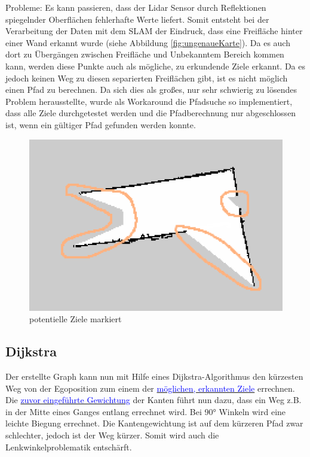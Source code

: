 Probleme:
Es kann passieren, dass der Lidar Sensor durch Reflektionen spiegelnder Oberflächen fehlerhafte Werte liefert. Somit entsteht bei der Verarbeitung der Daten mit dem SLAM der Eindruck, dass eine Freifläche hinter einer Wand erkannt wurde (siehe Abbildung \ref{fig:ungenaueKarte}). Da es auch dort zu Übergängen zwischen Freifläche und Unbekanntem Bereich kommen kann, werden diese Punkte auch als mögliche, zu erkundende Ziele erkannt. Da es jedoch keinen Weg zu diesen separierten Freiflächen gibt, ist es nicht möglich einen Pfad zu berechnen. Da sich dies als großes, nur sehr schwierig zu lösendes Problem herausstellte, wurde als Workaround die Pfadsuche so implementiert, dass alle Ziele durchgetestet werden und die Pfadberechnung nur abgeschlossen ist, wenn ein gültiger Pfad gefunden werden konnte.


\begin{figure}[h]
\begin{center}
\includegraphics[width=15cm]{images/chapter6/MapUebergaenge_Markiert.png}
\caption{potentielle Ziele markiert}
\label{Map_aus_Graph}
\end{center}
\end{figure}



\subsection{Dijkstra}


Der erstellte Graph kann nun mit Hilfe eines Dijkstra-Algorithmus den kürzesten Weg von der Egoposition zum einem der 
\hyperref[sec:ziele]{\textcolor{blue}{möglichen, erkannten Ziele}} errechnen. Die \hyperref[sec:gewichtung]{\textcolor{blue}{zuvor eingeführte Gewichtung}} der Kanten führt nun dazu, dass ein Weg z.B. in der Mitte eines Ganges entlang errechnet wird. Bei 90° Winkeln wird eine leichte Biegung errechnet. Die Kantengewichtung ist auf dem kürzeren Pfad zwar schlechter, jedoch ist der Weg kürzer. Somit wird auch die Lenkwinkelproblematik entschärft. 

